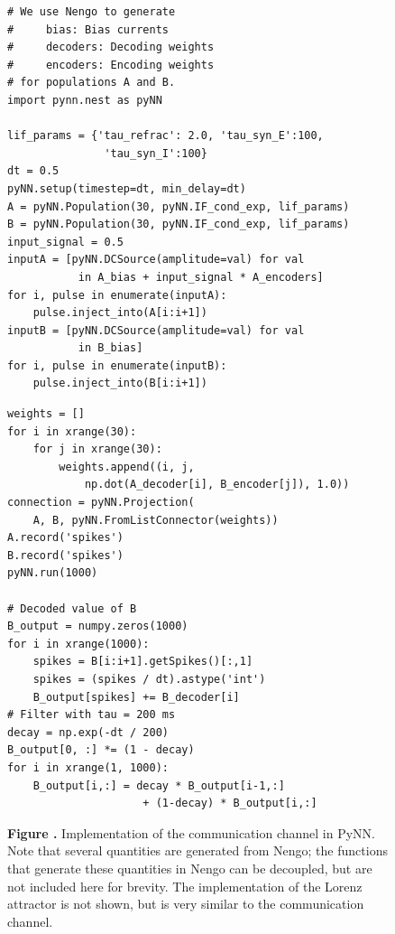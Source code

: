 \documentclass{frontiersSCNS}
\begin{document}
\begin{figure}
\begin{center}
  \begin{minipage}{.435\textwidth}
    \begin{lstlisting}[basicstyle={\footnotesize\ttfamily}]
# We use Nengo to generate
#     bias: Bias currents
#     decoders: Decoding weights
#     encoders: Encoding weights
# for populations A and B.
import pynn.nest as pyNN

lif_params = {'tau_refrac': 2.0, 'tau_syn_E':100,
               'tau_syn_I':100}
dt = 0.5
pyNN.setup(timestep=dt, min_delay=dt)
A = pyNN.Population(30, pyNN.IF_cond_exp, lif_params)
B = pyNN.Population(30, pyNN.IF_cond_exp, lif_params)
input_signal = 0.5
inputA = [pyNN.DCSource(amplitude=val) for val
           in A_bias + input_signal * A_encoders]
for i, pulse in enumerate(inputA):
    pulse.inject_into(A[i:i+1])
inputB = [pyNN.DCSource(amplitude=val) for val
           in B_bias]
for i, pulse in enumerate(inputB):
    pulse.inject_into(B[i:i+1])
    \end{lstlisting}
  \end{minipage}
  \begin{minipage}{.46\textwidth}
    \begin{lstlisting}[basicstyle={\footnotesize\ttfamily}]
weights = []
for i in xrange(30):
    for j in xrange(30):
        weights.append((i, j,
            np.dot(A_decoder[i], B_encoder[j]), 1.0))
connection = pyNN.Projection(
    A, B, pyNN.FromListConnector(weights))
A.record('spikes')
B.record('spikes')
pyNN.run(1000)

# Decoded value of B
B_output = numpy.zeros(1000)
for i in xrange(1000):
    spikes = B[i:i+1].getSpikes()[:,1]
    spikes = (spikes / dt).astype('int')
    B_output[spikes] += B_decoder[i]
# Filter with tau = 200 ms
decay = np.exp(-dt / 200)
B_output[0, :] *= (1 - decay)
for i in xrange(1, 1000):
    B_output[i,:] = decay * B_output[i-1,:]
                     + (1-decay) * B_output[i,:]
    \end{lstlisting}
  \end{minipage}
\end{center}
 \textbf{\label{fig:pynn} Figure .}{
   Implementation of the communication channel in PyNN.
   Note that several quantities are generated from Nengo;
   the functions that generate these quantities in Nengo
   can be decoupled, but are not included here for brevity.
   The implementation of the Lorenz attractor
   is not shown, but is very similar to the communication channel.}
\end{figure}
\end{document}
